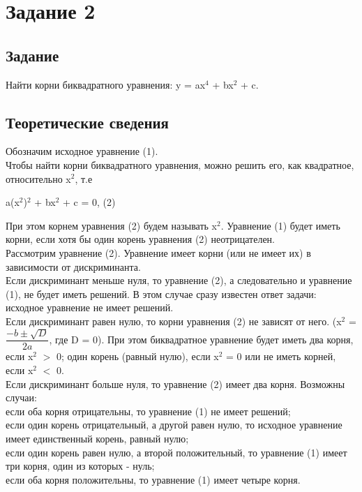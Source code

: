 \documentclass[12pt,a4paper]{report}
\begin{document}
\section{Задание 2}
\subsection{Задание}
Найти корни биквадратного уравнения: y = ax$^{4}$ + bx$^{2}$ + c.
\subsection{Теоретические сведения}
Обозначим исходное уравнение (1). \\
Чтобы найти корни биквадратного уравнения, можно решить его, как квадратное, относительно x$^{2}$, т.е
\begin{center}
  a(x$^{2}$)$^{2}$ + bx$^{2}$ + c = 0,    (2)
\end{center} 
При этом корнем уравнения (2) будем называть x$^{2}$.
Уравнение (1) будет иметь корни, если хотя бы один корень уравнения (2) неотрицателен. \\
Рассмотрим уравнение (2). Уравнение имеет корни (или не имеет их) в зависимости от дискриминанта. \\
Если дискриминант меньше нуля, то уравнение (2), а следовательно и уравнение (1), не будет иметь решений. В этом случае сразу известен ответ задачи: исходное уравнение не имеет решений. \\
Если дискриминант равен нулю, то корни уравнения (2) не зависят от него. (x$^{2}$ = $\dfrac{-b \pm \sqrt{D}}{2a}$, где D = 0). При этом биквадратное уравнение будет иметь два корня, если x$^{2}$ $>$ 0; один корень (равный нулю), если x$^2$ = 0 или не иметь корней, если x$^{2}$ $<$ 0. \\ 
Если дискриминант больше нуля, то уравнение (2) имеет два корня. Возможны случаи: \\
если оба корня отрицательны, то уравнение (1) не имеет решений; \\
если один корень отрицательный, а другой равен нулю, то исходное уравнение имеет единственный корень, равный нулю; \\
если один корень равен нулю, а второй положительный, то уравнение (1) имеет три корня, один из которых - нуль; \\
если оба корня положительны, то уравнение (1) имеет четыре корня. 
\end{document}
